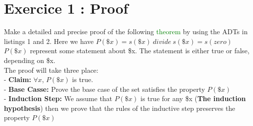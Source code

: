 \section{Exercice 1 : Proof}
Make a detailed and precise proof of the following \textcolor{green}{theorem} by using the ADTs
in listings 1 and 2.
\label{theorem}
Here we have $P(\$x) = s(\$x)\ divide\ s(\$x) = s(zero)$
$P(\$x)$ represent some statement about \$x. The statement is either true or false, depending on \$x.\\
The proof will take three place:\\
- \textbf{Claim: } $\forall x $, $P(\$x)$ is true.\\
- \textbf{Base Casse:} Prove the base case of the set satisfies the property $P(\$x)$\\
- \textbf{Induction Step:} We assume that $P(\$x)$ is true for any \$x (\textbf{The induction hypothesis}) then we prove that the rules of the inductive step preserves the property $P(\$x)$
